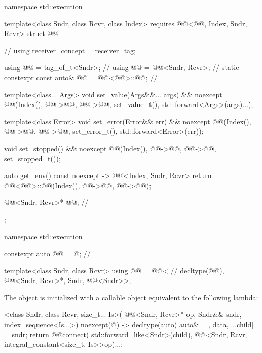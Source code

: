 \pnum
\begin{codeblock}
namespace std::execution {
  template<class Sndr, class Rcvr, class Index>
    requires @@<@@, Index, Sndr, Rcvr>
  struct @@ {                                       // \expos
    using receiver_concept = receiver_tag;

    using @@ = tag_of_t<Sndr>;                               // \expos
    using @@ = @@<Sndr, Rcvr>;                     // \expos
    static constexpr const auto& @@ = @@<@@>::@@;         // \expos

    template<class... Args>
    void set_value(Args&&... args) && noexcept {
      @@(Index(), @@->@@, @@->@@, set_value_t(), std::forward<Args>(args)...);
    }

    template<class Error>
    void set_error(Error&& err) && noexcept {
      @@(Index(), @@->@@, @@->@@, set_error_t(), std::forward<Error>(err));
    }

    void set_stopped() && noexcept {
      @@(Index(), @@->@@, @@->@@, set_stopped_t());
    }

    auto get_env() const noexcept -> @@<Index, Sndr, Rcvr> {
      return @@<@@>::@@(Index(), @@->@@, @@->@@);
    }

    @@<Sndr, Rcvr>* @@;                                // \expos
  };
}
\end{codeblock}

\begin{codeblock}
namespace std::execution {
  constexpr auto @@ = @\seebelownc@;                       // \expos

  template<class Sndr, class Rcvr>
  using @@ = @@<                     // \expos
    decltype(@@), @@<Sndr, Rcvr>*, Sndr, @@<Sndr>>;
}
\end{codeblock}

\pnum
The object  is initialized with
a callable object equivalent to the following lambda:
\begin{itemdecl}
[]<class Sndr, class Rcvr, size_t... Is>(
  @@<Sndr, Rcvr>* op, Sndr&& sndr, index_sequence<Is...>) noexcept(@\seebelow@)
    -> decltype(auto) {
    auto& [_, data, ...child] = sndr;
    return @@{connect(
      std::forward_like<Sndr>(child),
      @@<Sndr, Rcvr, integral_constant<size_t, Is>>{op})...};
  }
\end{itemdecl}

